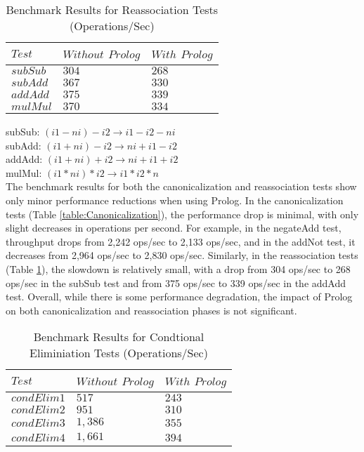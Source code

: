 \begin{table}[h]
    \centering
    \fontsize{9pt}{9pt}
    \begin{tabular}{|l|l|l|}
        \hline
        $Test$ & $Without$ $Prolog$ & $With$ $Prolog$ \\
        \hline
        $subSub$ & $304$ & $268$ \\
        $subAdd$ & $367$ & $330$ \\
        $addAdd$ & $375$ & $339$ \\
        $mulMul$ & $370$ & $334$ \\
        \hline
    \end{tabular}
    \caption{Benchmark Results for Reassociation Tests (Operations/Sec)}
    \label{table:Reassociation}
\end{table}
\smallbreak

\noindent subSub: $(i1 - ni) - i2 \rightarrow i1 - i2 - ni$\\
subAdd: $(i1 + ni) - i2 \rightarrow ni + i1 - i2$\\
addAdd: $(i1 + ni) + i2 \rightarrow ni + i1 + i2$\\
mulMul: $(i1 * ni) * i2 \rightarrow i1 * i2 * n$\\


The benchmark results for both the canonicalization and reassociation tests show only minor performance reductions when using Prolog. 
In the canonicalization tests (Table \ref{table:Canonicalization}), the performance drop is minimal, with only slight decreases in operations per second. 
For example, in the negateAdd test, throughput drops from 2,242 ops/sec to 2,133 ops/sec, and in the addNot test, it decreases from 2,964 ops/sec to 2,830 ops/sec. 
Similarly, in the reassociation tests (Table \ref{table:Reassociation}), the slowdown is relatively small, with a drop from 304 ops/sec to 268 ops/sec in the subSub test and from 375 ops/sec to 339 ops/sec in the addAdd test.
Overall, while there is some performance degradation, the impact of Prolog on both canonicalization and reassociation phases is not significant.



\begin{table}[h]
    \centering
    \fontsize{9pt}{9pt}
    \begin{tabular}{|l|l|l|}
        \hline
        $Test$ & $Without$ $Prolog$ & $With$ $Prolog$ \\
        \hline
        $condElim1$ & $517$ & $243$ \\
        $condElim2$ & $951$ & $310$ \\
        $condElim3$ & $1,386$ & $355$ \\
        $condElim4$ & $1,661$ & $394$ \\
        \hline
    \end{tabular}
    \caption{Benchmark Results for Condtional Eliminiation Tests (Operations/Sec)}
    \label{table:condElimination}
\end{table} 

